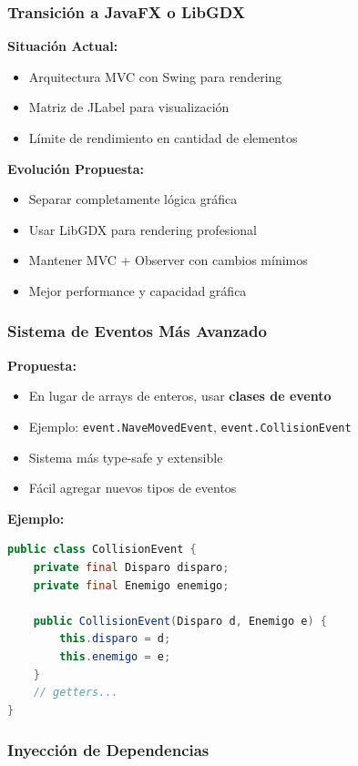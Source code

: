\documentclass[12pt, a4paper]{article}
\begin{document}
\subsubsection{Transición a JavaFX o LibGDX}

\textbf{Situación Actual:}
\begin{itemize}[leftmargin=2em]
    \item Arquitectura MVC con Swing para rendering
    \item Matriz de JLabel para visualización
    \item Límite de rendimiento en cantidad de elementos
\end{itemize}

\textbf{Evolución Propuesta:}
\begin{itemize}[leftmargin=2em]
    \item Separar completamente lógica gráfica
    \item Usar LibGDX para rendering profesional
    \item Mantener MVC + Observer con cambios mínimos
    \item Mejor performance y capacidad gráfica
\end{itemize}

\subsubsection{Sistema de Eventos Más Avanzado}

\textbf{Propuesta:}
\begin{itemize}[leftmargin=2em]
    \item En lugar de arrays de enteros, usar \textbf{clases de evento}
    \item Ejemplo: \texttt{event.NaveMovedEvent}, \texttt{event.CollisionEvent}
    \item Sistema más type-safe y extensible
    \item Fácil agregar nuevos tipos de eventos
\end{itemize}

\textbf{Ejemplo:}
\begin{lstlisting}[language=Java]
public class CollisionEvent {
    private final Disparo disparo;
    private final Enemigo enemigo;
    
    public CollisionEvent(Disparo d, Enemigo e) {
        this.disparo = d;
        this.enemigo = e;
    }
    // getters...
}
\end{lstlisting}

\subsubsection{Inyección de Dependencias}
\end{document}
